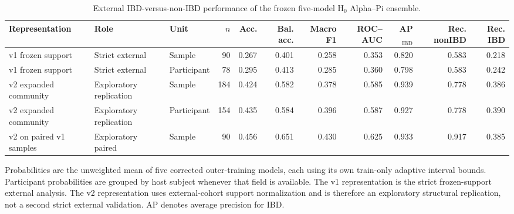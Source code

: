 \begin{table}[htbp]
\centering
\small
\caption{External IBD-versus-non-IBD performance of the frozen five-model H$_0$ Alpha--Pi ensemble.}
\label{tab:external_h0_alphapi}
\begin{tabular}{lllrrrrrrrr}
\toprule
Representation & Role & Unit & $n$ & Acc. & Bal. acc. & Macro F1 & ROC--AUC & AP$_{\mathrm{IBD}}$ & Rec. nonIBD & Rec. IBD \\
\midrule
v1 frozen support & Strict external & Sample & 90 & 0.267 & 0.401 & 0.258 & 0.353 & 0.820 & 0.583 & 0.218 \\
v1 frozen support & Strict external & Participant & 78 & 0.295 & 0.413 & 0.285 & 0.360 & 0.798 & 0.583 & 0.242 \\
v2 expanded community & Exploratory replication & Sample & 184 & 0.424 & 0.582 & 0.378 & 0.585 & 0.939 & 0.778 & 0.386 \\
v2 expanded community & Exploratory replication & Participant & 154 & 0.435 & 0.584 & 0.396 & 0.587 & 0.927 & 0.778 & 0.390 \\
v2 on paired v1 samples & Exploratory paired & Sample & 90 & 0.456 & 0.651 & 0.430 & 0.625 & 0.933 & 0.917 & 0.385 \\
\bottomrule
\end{tabular}
\begin{minipage}{0.98\linewidth}
\footnotesize
Probabilities are the unweighted mean of five corrected outer-training models, each using its own train-only adaptive interval bounds. Participant probabilities are grouped by host subject whenever that field is available. The v1 representation is the strict frozen-support external analysis. The v2 representation uses external-cohort support normalization and is therefore an exploratory structural replication, not a second strict external validation. AP denotes average precision for IBD.
\end{minipage}
\end{table}
